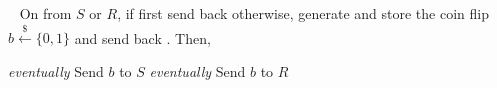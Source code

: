 \begin{minipage}{0.5\textwidth}
\begin{bbox}[title={Functionality $\F_\m{flip}(S,R)$}]
~
On  from $S$ or $R$, if first  send back  otherwise, generate and store the coin flip $b \xleftarrow{\$} \{0,1\}$ and send back . Then,

\begin{itemize}
\citem \emph{eventually} Send $b$ to $S$
\citem \emph{eventually} Send $b$ to $R$
\end{itemize}
\end{bbox}
\end{minipage}
